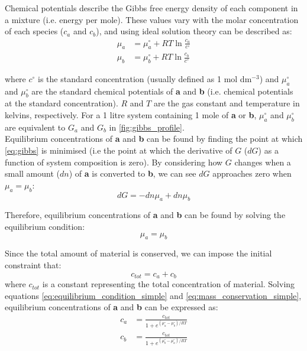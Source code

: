 \documentclass[12pt]{"report"}
\begin{document}
Chemical potentials describe the Gibbs free energy density of each component in a mixture (i.e. energy per mole). These values vary with the molar concentration of each species ($c_a$ and $c_b$), and using ideal solution theory can be described as:
\begin{align}
\mu_a &= \mu_a^{\circ} + RT \ln \frac{c_a}{c^{\circ}}\\
\mu_b &= \mu_b^{\circ} + RT \ln \frac{c_b}{c^{\circ}}
\end{align} 

where $c^{\circ}$ is the standard concentration (usually defined as 1 mol dm$^{-3}$) and $\mu_a^{\circ}$ and $\mu_b^{\circ}$ are the standard chemical potentials of \textbf{a} and \textbf{b} (i.e. chemical potentials at the standard concentration). $R$ and $T$ are the gas constant and temperature in kelvins, respectively. For a 1 litre system containing 1 mole of \textbf{a} or \textbf{b}, $\mu_a^{\circ}$ and $\mu_b^{\circ}$ are equivalent to $G_a$ and $G_b$ in \cref{fig:gibbs_profile}.\\

Equilibrium concentrations of \textbf{a} and \textbf{b} can be found by finding the point at which \cref{eq:gibbs} is minimised (i.e the point at which the derivative of $G$ ($dG$) as a function of system composition is zero). By considering how $G$ changes when a small amount ($dn$) of \textbf{a} is converted to \textbf{b}, we can see $dG$ approaches zero when $\mu_a = \mu_b$:
\begin{equation}
dG = - dn \mu_a + dn \mu_b
\end{equation}

Therefore, equilibrium concentrations of \textbf{a} and \textbf{b} can be found by solving the equilibrium condition:
\begin{equation}
\mu_a = \mu_b
\label{eq:equilibrium_condition_simple}
\end{equation}

Since the total amount of material is conserved, we can impose the initial constraint that:
\begin{equation}
c_{tot} = c_a + c_b
\label{eq:mass_conservation_simple}
\end{equation}
where $c_{tot}$ is a constant representing the total concentration of material. Solving equations \ref{eq:equilibrium_condition_simple} and \ref{eq:mass_conservation_simple}, equilibrium concentrations of \textbf{a} and \textbf{b} can be expressed as:
\begin{align}
c_a &= \frac{c_{tot}}{1 + e^{(\mu_a^{\circ} - \mu_b^{\circ})/RT}}\\
c_b &= \frac{c_{tot}}{1 + e^{(\mu_b^{\circ} - \mu_a^{\circ})/RT}}
\end{align}
\end{document}
